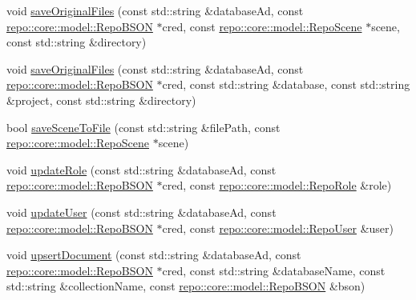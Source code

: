 \begin{DoxyCompactItemize}
\item 
void \hyperlink{classrepo_1_1manipulator_1_1_repo_manipulator_a423c50def32d9610011578095a2895ef}{save\+Original\+Files} (const std\+::string \&database\+Ad, const \hyperlink{classrepo_1_1core_1_1model_1_1_repo_b_s_o_n}{repo\+::core\+::model\+::\+Repo\+B\+S\+O\+N} $\ast$cred, const \hyperlink{classrepo_1_1core_1_1model_1_1_repo_scene}{repo\+::core\+::model\+::\+Repo\+Scene} $\ast$scene, const std\+::string \&directory)
\item 
void \hyperlink{classrepo_1_1manipulator_1_1_repo_manipulator_abe406f89bd26947ba572907c615904d6}{save\+Original\+Files} (const std\+::string \&database\+Ad, const \hyperlink{classrepo_1_1core_1_1model_1_1_repo_b_s_o_n}{repo\+::core\+::model\+::\+Repo\+B\+S\+O\+N} $\ast$cred, const std\+::string \&database, const std\+::string \&project, const std\+::string \&directory)
\item 
bool \hyperlink{classrepo_1_1manipulator_1_1_repo_manipulator_a5b2eb9343995c851060881d5bf8809b5}{save\+Scene\+To\+File} (const std\+::string \&file\+Path, const \hyperlink{classrepo_1_1core_1_1model_1_1_repo_scene}{repo\+::core\+::model\+::\+Repo\+Scene} $\ast$scene)
\item 
void \hyperlink{classrepo_1_1manipulator_1_1_repo_manipulator_ab7f41fa63bc40207368b147ad02f9899}{update\+Role} (const std\+::string \&database\+Ad, const \hyperlink{classrepo_1_1core_1_1model_1_1_repo_b_s_o_n}{repo\+::core\+::model\+::\+Repo\+B\+S\+O\+N} $\ast$cred, const \hyperlink{classrepo_1_1core_1_1model_1_1_repo_role}{repo\+::core\+::model\+::\+Repo\+Role} \&role)
\item 
void \hyperlink{classrepo_1_1manipulator_1_1_repo_manipulator_a47d020aa3670a5ba61d430959f5414f5}{update\+User} (const std\+::string \&database\+Ad, const \hyperlink{classrepo_1_1core_1_1model_1_1_repo_b_s_o_n}{repo\+::core\+::model\+::\+Repo\+B\+S\+O\+N} $\ast$cred, const \hyperlink{classrepo_1_1core_1_1model_1_1_repo_user}{repo\+::core\+::model\+::\+Repo\+User} \&user)
\item 
void \hyperlink{classrepo_1_1manipulator_1_1_repo_manipulator_ab982734dbade0d224aaa53f9ab4eba2a}{upsert\+Document} (const std\+::string \&database\+Ad, const \hyperlink{classrepo_1_1core_1_1model_1_1_repo_b_s_o_n}{repo\+::core\+::model\+::\+Repo\+B\+S\+O\+N} $\ast$cred, const std\+::string \&database\+Name, const std\+::string \&collection\+Name, const \hyperlink{classrepo_1_1core_1_1model_1_1_repo_b_s_o_n}{repo\+::core\+::model\+::\+Repo\+B\+S\+O\+N} \&bson)
\end{DoxyCompactItemize}


